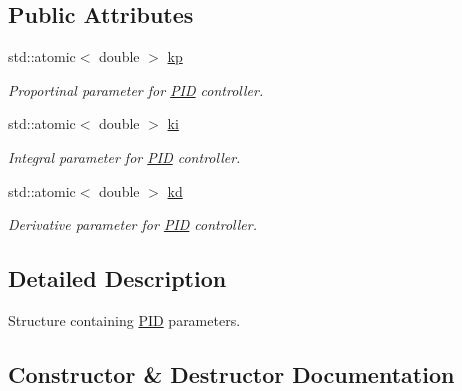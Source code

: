 \subsection*{Public Attributes}
\begin{DoxyCompactItemize}
\item 
\mbox{\label{structackermann_1_1_p_i_d_params_ac94fb3a31bae97e0a81be34d59c01e23}} 
std\+::atomic$<$ double $>$ \hyperlink{structackermann_1_1_p_i_d_params_ac94fb3a31bae97e0a81be34d59c01e23}{kp}
\begin{DoxyCompactList}\small\item\em Proportinal parameter for \hyperlink{classackermann_1_1_p_i_d}{P\+ID} controller. \end{DoxyCompactList}\item 
\mbox{\label{structackermann_1_1_p_i_d_params_abfd61b70a679bcf4c8fdde0caaee3e55}} 
std\+::atomic$<$ double $>$ \hyperlink{structackermann_1_1_p_i_d_params_abfd61b70a679bcf4c8fdde0caaee3e55}{ki}
\begin{DoxyCompactList}\small\item\em Integral parameter for \hyperlink{classackermann_1_1_p_i_d}{P\+ID} controller. \end{DoxyCompactList}\item 
\mbox{\label{structackermann_1_1_p_i_d_params_afe64009f02585364c495db3e271cafaa}} 
std\+::atomic$<$ double $>$ \hyperlink{structackermann_1_1_p_i_d_params_afe64009f02585364c495db3e271cafaa}{kd}
\begin{DoxyCompactList}\small\item\em Derivative parameter for \hyperlink{classackermann_1_1_p_i_d}{P\+ID} controller. \end{DoxyCompactList}\end{DoxyCompactItemize}


\subsection{Detailed Description}
Structure containing \hyperlink{classackermann_1_1_p_i_d}{P\+ID} parameters. 

\subsection{Constructor \& Destructor Documentation}
\mbox{\label{structackermann_1_1_p_i_d_params_abc40fbe7129262423b702336914df26a}} 

